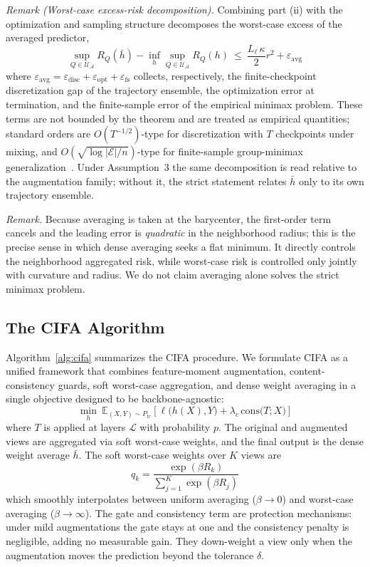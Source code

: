 \documentclass[electronics,article,submit,moreauthors]{Definitions/mdpi}
\newcommand{\add}[1]{\textcolor{addblue}{#1}}
\def\add#1{#1}%
\renewcommand{\add}[1]{#1}
\begin{document}
\textit{Remark (Worst-case excess-risk decomposition).} Combining part (ii) with the optimization and sampling structure decomposes the worst-case excess of the averaged predictor,
\begin{equation}
\sup_{Q\in\mathcal{U}_{\mathcal{A}}}R_Q(\bar h)-\inf_h\sup_{Q\in\mathcal{U}_{\mathcal{A}}}R_Q(h)\ \leq\ \frac{L_\ell\,\kappa}{2}r^{2}+\varepsilon_{\mathrm{avg}}
\end{equation}
where $\varepsilon_{\mathrm{avg}}=\varepsilon_{\mathrm{disc}}+\varepsilon_{\mathrm{opt}}+\varepsilon_{\mathrm{fs}}$ collects, respectively, the finite-checkpoint discretization gap of the trajectory ensemble, the optimization error at termination, and the finite-sample error of the empirical minimax problem. These terms are not bounded by the theorem and are treated as empirical quantities; standard orders are $O(T^{-1/2})$-type for discretization with $T$ checkpoints under mixing, and $O(\sqrt{\log|\mathcal{E}|/n})$-type for finite-sample group-minimax generalization~\citep{ref10}. Under Assumption~3 the same decomposition is read relative to the augmentation family; without it, the strict statement relates $\bar h$ only to its own trajectory ensemble.

\textit{Remark.} Because averaging is taken at the barycenter, the first-order term cancels and the leading error is \emph{quadratic} in the neighborhood radius; this is the precise sense in which dense averaging seeks a flat minimum. It directly controls the neighborhood aggregated risk, while worst-case risk is controlled only jointly with curvature and radius. We do not claim averaging alone solves the strict minimax problem.

\subsection{The CIFA Algorithm}
\label{sec:algorithm}

Algorithm~\ref{alg:cifa} summarizes the CIFA procedure. We formulate CIFA as a unified framework that combines feature-moment augmentation, content-consistency guards, soft worst-case aggregation, and dense weight averaging in a single objective \add{designed to be backbone-agnostic}:
\begin{equation}
\min_h\ \mathbb{E}_{(X,Y)\sim P_{tr}}\!\left[\ell\big(h(X),Y\big)+\lambda_c\,\mathrm{cons}\big(T;X\big)\right]
\end{equation}
where $T$ is applied at layers $\mathcal{L}$ with probability $p$. The original and augmented views are aggregated via soft worst-case weights, and the final output is the dense weight average $\bar h$. The soft worst-case weights over $K$ views are
\begin{equation}
q_k=\frac{\exp(\beta R_k)}{\sum_{j=1}^{K}\exp(\beta R_j)}
\end{equation}
which smoothly interpolates between uniform averaging ($\beta\to 0$) and worst-case averaging ($\beta\to\infty$). The gate and consistency term are protection mechanisms: under mild augmentations the gate stays at one and the consistency penalty is negligible, adding no measurable gain. They down-weight a view only when the augmentation moves the prediction beyond the tolerance $\delta$.
\end{document}
